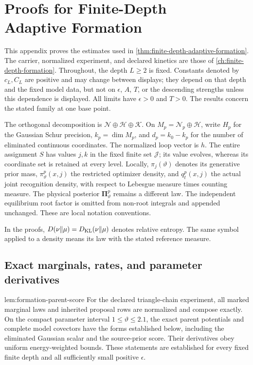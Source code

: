 \chapter[Proofs for Finite-Depth Adaptive Formation]{Proofs for Finite-Depth\\Adaptive Formation}
\label{app:finite-depth-formation-proofs}

This appendix proves the estimates used in
\cref{thm:finite-depth-adaptive-formation}. The carrier, normalized
experiment, and declared kinetics are those of
\cref{ch:finite-depth-formation}. Throughout, the depth $L\ge2$ is fixed.
Constants denoted by $c_L,C_L$ are positive and may change between
displays; they depend on that depth and the fixed model data, but not on
$\epsilon$, $A$, $T$, or the descending strengths unless this dependence
is displayed. All limits have $\epsilon>0$ and $T>0$. The results concern
the stated family at one base point. 

The orthogonal decomposition is
$\mathcal N\oplus\mathcal H\oplus\mathcal K$. On
$M_p=\mathcal N_p\oplus\mathcal H$, write $H_p$ for the Gaussian
Schur precision, $k_p=\dim M_p$, and $d_p=k_0-k_p$ for the number of
eliminated continuous coordinates. The normalized loop vector is $h$.
The entire assignment $S$ has values $j,k$ in the fixed finite set
$\mathcal J$; its value evolves, whereas its coordinate set is retained
at every level. Locally, $\pi_j(\vartheta)$ denotes its generative
prior mass, $\pi_\vartheta^p(x,j)$ the restricted optimizer density,
and $q_t^p(x,j)$ the actual joint recognition density, with respect to
Lebesgue measure times counting measure. The physical posterior
$\boldsymbol\Pi_\vartheta^p$ remains a different law. The independent
equilibrium root factor is omitted from non-root integrals and appended
unchanged. These are local notation conventions. 

In the proofs, $D(\nu\Vert\mu)=D_{\mathrm{KL}}(\nu\Vert\mu)$ denotes relative
entropy. The same symbol applied to a density means its law with
the stated reference measure. 

\section{Exact marginals, rates, and parameter derivatives}
\label{sec:rg-formation-exact-proof}

{lem:formation-parent-score}
For the declared triangle-chain experiment, all marked marginal laws
and inherited proposal rows are normalized and compose exactly. On the
compact parameter interval $1\le\vartheta\le2.1$, the exact parent
potentials and complete model covectors have the forms established
below, including the eliminated Gaussian scalar and the source-prior
score. Their derivatives obey uniform energy-weighted bounds. These
statements are established for every fixed finite depth and all
sufficiently small positive $\epsilon$. 


